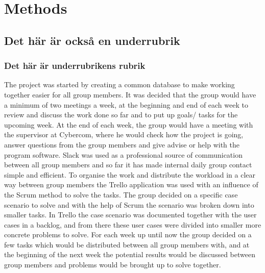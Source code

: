 \section{Methods}
\subsection{Det här är också en underrubrik}
\subsubsection{Det här är underrubrikens rubrik}

\bigskip 

The project was started by creating a common database to make working together easier for all group members. It was decided that the group would have a minimum of two meetings a week, at the beginning and end of each week to review and discuss the work done so far and to put up goals/ tasks for the upcoming week. At the end of each week, the group would have a meeting with the supervisor at Cybercom, where he would check how the project is going, answer questions from the group members and give advise or help with the program software. Slack was used as a professional source of communication between all group members and so far it has made internal daily group contact simple and efficient. To organise the work and distribute the workload in a clear way between group members the Trello application was used with an influence of the Scrum method to solve the tasks. The group decided on  a specific case scenario to solve and with the help of Scrum the scenario was broken down into smaller tasks. In Trello the case scenario was documented together with the user cases in a backlog, and from there these user cases were divided  into smaller more concrete problems to solve. For each week up until now the group decided on a few tasks which would be distributed between all group members with, and at the beginning of the next week the  potential results would be discussed between group members and problems would be brought up to solve together. 
